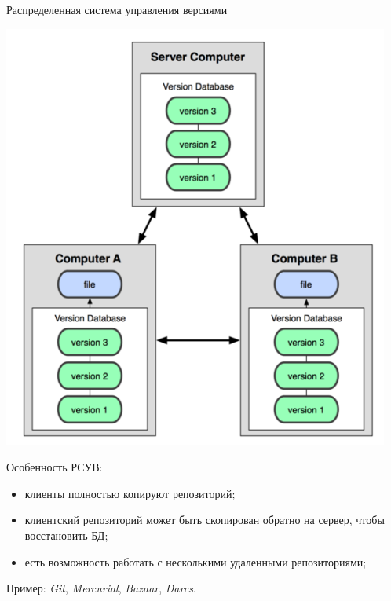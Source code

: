 \documentclass{beamer}
\begin{document}
\begin{frame}
\begin{block}{Распределенная система управления версиями}
\begin{center}
\includegraphics[scale=0.3]{images/decentral.png}
\end{center}
\end{block}
Особенность РСУВ:
\begin{itemize}
\item клиенты полностью копируют репозиторий;
\item клиентский репозиторий может быть скопирован обратно на сервер, чтобы восстановить БД;
\item есть возможность работать с несколькими удаленными репозиториями; 
\end{itemize}
Пример: \textit{Git}, \textit{Mercurial}, \textit{Bazaar}, \textit{Darcs}.
\end{frame} 
\end{document}
